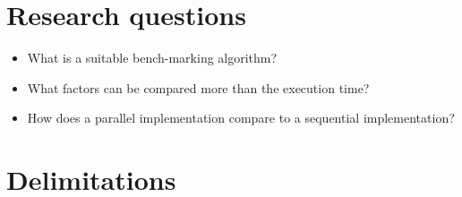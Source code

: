 \section{Research questions}  %

\begin{itemize}
    \item What is a suitable bench-marking algorithm?
    \item What factors can be compared more than the execution time?
    \item How does a parallel implementation compare to a sequential implementation?
\end{itemize}


\section{Delimitations}

\nomenclature[]{}{}
